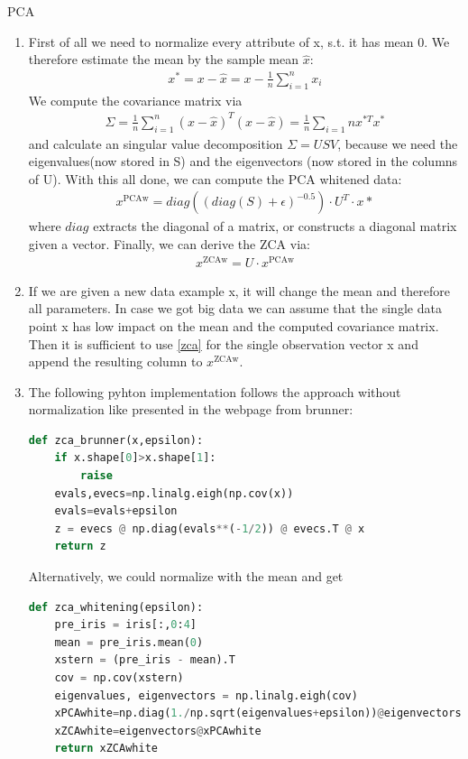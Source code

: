 \begin{task}[]{PCA}
\begin{subtask}
\begin{enumerate}
	\item
	First of all we need to normalize every attribute of x, s.t. it has mean 0. We therefore estimate the mean by the sample mean $\hat{x}$:
	\begin{align*}
	x^* = x - \hat{x}=x-\frac{1}{n}\sum_{i=1}^n x_i
	\end{align*}
	We compute the covariance matrix via
	\begin{align*}
	\Sigma=\frac{1}{n}\sum_{i=1}^{n} (x-\hat{x})^T (x-\hat{x})=\frac{1}{n}\sum_{i=1}{n} x^{*T} x^{*}
	\end{align*}
	and calculate an singular value decomposition $\Sigma=USV$, because we need the eigenvalues(now stored in S) and the eigenvectors (now stored in the columns of U). With this all done, we can compute the PCA whitened data:
	\begin{align*}
	x^{\text{PCAw}}=diag((diag(S)+\epsilon)^{-0.5})\cdot U^T\cdot x*
	\end{align*}
	where $diag$ extracts the diagonal of a matrix, or constructs a diagonal matrix given a vector.
	Finally, we can derive the ZCA via:
	\begin{align}\label{zca}
	x^{\text{ZCAw}}=U\cdot x^{\text{PCAw}}
	\end{align}
	\item
	If we are given a new data example x, it will change the mean and therefore all parameters. In case we got big data we can assume that the single data point x has low impact on the mean and the computed covariance matrix. Then it is sufficient to use \ref{zca} for the single observation vector x and append the resulting column to $x^{\text{ZCAw}}$. \\
	\item The following pyhton implementation follows the approach without normalization like presented in the webpage from brunner:
	\begin{lstlisting}[language=python]
def zca_brunner(x,epsilon):
	if x.shape[0]>x.shape[1]:
		raise
	evals,evecs=np.linalg.eigh(np.cov(x))
	evals=evals+epsilon
	z = evecs @ np.diag(evals**(-1/2)) @ evecs.T @ x
	return z
	\end{lstlisting}
	Alternatively, we could normalize with the mean and get
	\begin{lstlisting}[language=python]
def zca_whitening(epsilon):
	pre_iris = iris[:,0:4]
	mean = pre_iris.mean(0)
	xstern = (pre_iris - mean).T
	cov = np.cov(xstern)
	eigenvalues, eigenvectors = np.linalg.eigh(cov)
	xPCAwhite=np.diag(1./np.sqrt(eigenvalues+epsilon))@eigenvectors.T@xstern
	xZCAwhite=eigenvectors@xPCAwhite
	return xZCAwhite
	\end{lstlisting}
	\end{enumerate}
\end{subtask}
\end{task}


